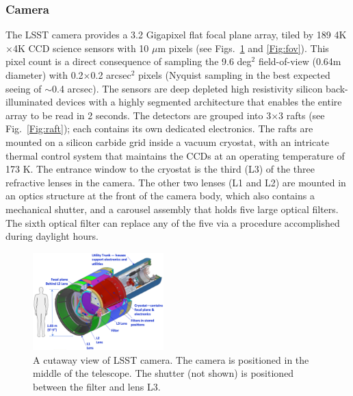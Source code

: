 \documentclass{emulateapj}
\begin{document}
\vskip 0.2in
\subsubsection{ Camera }


The LSST camera provides a 3.2 Gigapixel flat focal plane array, tiled by 189
4K$\times$4K CCD science sensors with 10 $\mu$m pixels (see Figs.~\ref{Fig:camera}
and \ref{Fig:fov}). This pixel count is a direct consequence of sampling the 
9.6 deg$^2$ field-of-view (0.64m diameter) with 0.2$\times$0.2 arcsec$^2$
pixels (Nyquist sampling in the best expected seeing of $\sim$0.4 arcsec). 
The sensors are deep depleted high resistivity silicon back-illuminated devices with 
a highly segmented architecture that enables the entire array to be read in 2 seconds. 
The detectors are grouped into 3$\times$3 rafts (see Fig.~\ref{Fig:raft}); each 
contains its own dedicated electronics. The rafts are mounted on a silicon carbide 
grid inside a vacuum cryostat, with an intricate thermal control system that maintains 
the CCDs at an operating temperature of 173 K. The entrance window to the
cryostat is the third (L3) of the three refractive lenses in the camera. The other
two lenses (L1 and L2) are mounted in an optics structure at the front of the camera 
body, which also contains a mechanical shutter, and a carousel assembly that holds 
five large optical filters. The sixth optical filter can 
replace any of the five via a procedure accomplished during daylight hours. 



\begin{figure}[t!]
\hskip 0.1in
\includegraphics[width=0.45\textwidth]{CameraFigureUpdated.pdf}
\caption{A cutaway view of LSST camera. The camera is positioned in the middle of the telescope.  The shutter (not shown) is positioned between the filter and lens L3.} 
\label{Fig:camera}
\end{figure}
\end{document}
